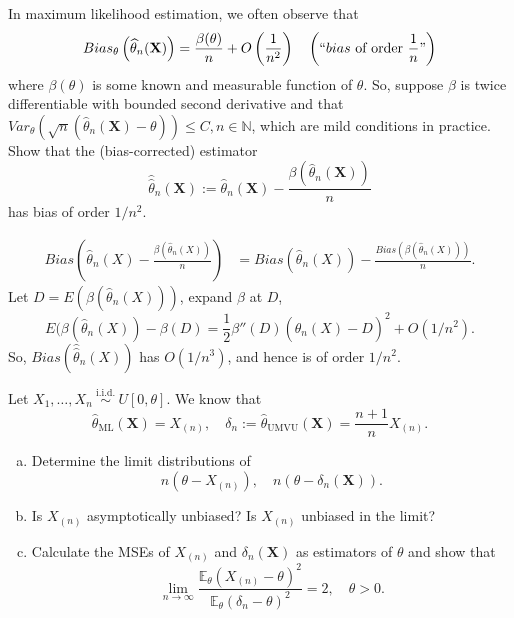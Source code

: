 \begin{ex}
    In maximum likelihood estimation, we often observe that
    \[
        Bias_{\theta}\left(\widehat{\theta}_{n}(\mathbf{X})\right)=\frac{\beta(\theta)}{n}+O\left(\frac{1}{n^{2}}\right) \quad\left(``b i a s \text { of order } \frac{1}{n} "\right)
    \]
    where \(\beta(\theta)\) is some known and measurable function of \(\theta\). So, suppose \(\beta\) is twice differentiable with bounded second derivative and that \(Var_{\theta}\left(\sqrt{n}\left(\widehat{\theta}_{n}(\mathbf{X})-\theta\right)\right) \leq C, n \in \mathbb{N}\), which are mild conditions in practice. Show that the (bias-corrected) estimator
    \[
        \widehat{\widehat{\theta}}_{n}(\mathbf{X}):=\widehat{\theta}_{n}(\mathbf{X})-\frac{\beta\left(\widehat{\theta}_{n}(\mathbf{X})\right)}{n}
    \]
    has bias of order \(1 / n^{2}\). 
\end{ex}

\begin{solution}
    \begin{align*}
        Bias\left(\hat{\theta}_n(X)-\frac{\beta(\hat{\theta}_n(X))}{n}\right)&=Bias(\hat{\theta}_n(X))-\frac{Bias(\beta(\hat{\theta}_n(X)))}{n}. 
    \end{align*}
    Let $D=E(\beta(\hat{\theta}_n(X)))$, expand $\beta$ at $D$, 
    \[
        E(\beta(\hat{\theta}_n(X))-\beta(D)=\frac{1}{2}\beta''(D)\left(\hat{\theta}_n(X)-D\right)^2+O(1/n^{2}). 
    \]
    So, $Bias(\hat{\hat{\theta}}_n(X))$ has $O(1/n^3)$, and hence is of order \(1/n^{2}\). 
\end{solution}


\begin{ex}
    Let \(X_{1}, \ldots, X_{n} \stackrel{\text { i.i.d. }}{\sim} U[0, \theta]\). We know that
    \[
        \widehat{\theta}_{\mathrm{ML}}(\mathbf{X})=X_{(n)}, \quad \delta_{n}:=\widehat{\theta}_{\mathrm{UMVU}}(\mathbf{X})=\frac{n+1}{n} X_{(n)}. 
    \]
    \begin{enumerate}[(a)]
        \item Determine the limit distributions of
        \[
            n\left(\theta-X_{(n)}\right), \quad n\left(\theta-\delta_{n}(\mathbf{X})\right). 
        \]
        \item Is \(X_{(n)}\) asymptotically unbiased? Is \(X_{(n)}\) unbiased in the limit? 
        \item Calculate the MSEs of \(X_{(n)}\) and \(\delta_{n}(\mathbf{X})\) as estimators of \(\theta\) and show that
        \[
            \lim _{n \rightarrow \infty} \frac{\mathbb{E}_{\theta}\left(X_{(n)}-\theta\right)^{2}}{\mathbb{E}_{\theta}\left(\delta_{n}-\theta\right)^{2}}=2, \quad \theta>0. 
        \]
    \end{enumerate}
\end{ex}

